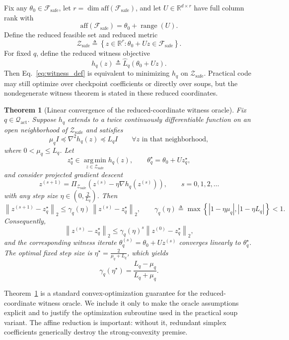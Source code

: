 \documentclass{article}
\newtheorem{theorem}{Theorem}
\newcommand{\RR}{\mathbb{R}}
\newcommand{\cF}{\mathcal{F}}
\newcommand{\cQ}{\mathcal{Q}}
\newcommand{\cZ}{\mathcal{Z}}
\newcommand{\argmin}{\operatorname*{arg\,min}}
\newcommand{\aff}{\mathrm{aff}}
\newcommand{\norm}[1]{\left\lVert #1 \right\rVert}
\newcommand{\abs}[1]{\left\lvert #1 \right\rvert}
\newcommand{\paren}[1]{\left( #1 \right)}
\newcommand{\braces}[1]{\left\{ #1 \right\}}
\newcommand{\safe}{\mathrm{safe}}
\newcommand{\act}{\mathrm{act}}
\begin{document}
Fix any \(\theta_0\in\cF_{\safe}\), let \(r=\dim \aff(\cF_{\safe})\), and let \(U\in\RR^{d\times r}\) have full column rank with
\[
\aff(\cF_{\safe}) = \theta_0 + \operatorname{range}(U).
\]
Define the reduced feasible set and reduced metric
\[
\cZ_{\safe}
\triangleq
\braces{z\in\RR^r : \theta_0 + Uz \in \cF_{\safe}}.
\]
For fixed \(q\), define the reduced witness objective
\[
h_q(z)
\triangleq
\widehat L_q(\theta_0 + Uz).
\]
Then Eq.~\eqref{eq:witness_def} is equivalent to minimizing \(h_q\) on \(\cZ_{\safe}\). Practical code may still optimize over checkpoint coefficients or directly over soups, but the nondegenerate witness theorem is stated in these reduced coordinates.

\begin{theorem}[Linear convergence of the reduced-coordinate witness oracle]
\label{thm:witness_pgd}
Fix \(q\in\cQ_{\act}\). Suppose \(h_q\) extends to a twice continuously differentiable function on an open neighborhood of \(\cZ_{\safe}\) and satisfies
\[
\mu_q I \preceq \nabla^2 h_q(z) \preceq L_q I
\qquad
\forall z \text{ in that neighborhood},
\]
where \(0<\mu_q\le L_q\). Let
\[
z_q^\star\in\argmin_{z\in\cZ_{\safe}} h_q(z),
\qquad
\theta_q^\star = \theta_0 + U z_q^\star,
\]
and consider projected gradient descent
\begin{equation}
z^{(s+1)}
=
\Pi_{\cZ_{\safe}}
\paren{
z^{(s)} - \eta \nabla h_q\paren{z^{(s)}}
},
\qquad s=0,1,2,\ldots
\label{eq:witness_pgd}
\end{equation}
with any step size \(\eta\in\paren{0,\frac{2}{L_q}}\). Then
\begin{equation}
\norm{z^{(s+1)}-z_q^\star}_2
\le
\gamma_q(\eta)\,
\norm{z^{(s)}-z_q^\star}_2,
\qquad
\gamma_q(\eta)
\triangleq
\max\braces{\abs{1-\eta\mu_q},\abs{1-\eta L_q}} < 1.
\label{eq:witness_pgd_rate}
\end{equation}
Consequently,
\[
\norm{z^{(s)}-z_q^\star}_2
\le
\gamma_q(\eta)^s
\norm{z^{(0)}-z_q^\star}_2,
\]
and the corresponding witness iterate \(\theta^{(s)}_q = \theta_0 + U z^{(s)}\) converges linearly to \(\theta_q^\star\). The optimal fixed step size is \(\eta^\star = \frac{2}{\mu_q + L_q}\), which yields
\[
\gamma_q(\eta^\star)
=
\frac{L_q-\mu_q}{L_q+\mu_q}.
\]
\end{theorem}

Theorem~\ref{thm:witness_pgd} is a standard convex-optimization guarantee for the reduced-coordinate witness oracle. We include it only to make the oracle assumptions explicit and to justify the optimization subroutine used in the practical soup variant. The affine reduction is important: without it, redundant simplex coefficients generically destroy the strong-convexity premise.
\end{document}
